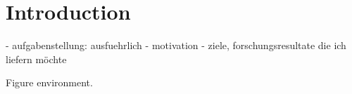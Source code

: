 \chapter{Introduction}

- aufgabenstellung: ausfuehrlich
- motivation
- ziele, forschungsresultate die ich liefern möchte

Figure environment.
